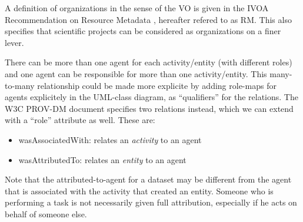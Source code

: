 A definition of organizations in the sense of the VO is given in the IVOA Recommendation on Resource Metadata \citep{std:ResourceMeta}, hereafter refered to as RM. This also specifies that scientific projects can be considered as organizations on a finer lever.

There can be more than one agent for each activity/entity (with different roles) and one agent can be responsible for more than one activity/entity. This many-to-many relationship could be made more explicite by adding role-maps for agents explicitely in the UML-class diagram, as ``qualifiers'' for the relations. The W3C PROV-DM document specifies two relations instead, which we can extend with a ``role'' attribute as well. These are:

\begin{itemize}
\item wasAssociatedWith: relates an \emph{activity} to an agent
\item wasAttributedTo: relates an \emph{entity} to an agent
\end{itemize}

Note that the attributed-to-agent for a dataset may be different from the agent that is associated with the activity that created an entity. Someone who is performing a task is not necessarily given full attribution, especially if he acts on behalf of someone else.


